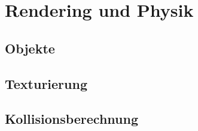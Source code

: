 \section{Rendering und Physik}

\subsection{Objekte}

\subsection{Texturierung}

\subsection{Kollisionsberechnung}

